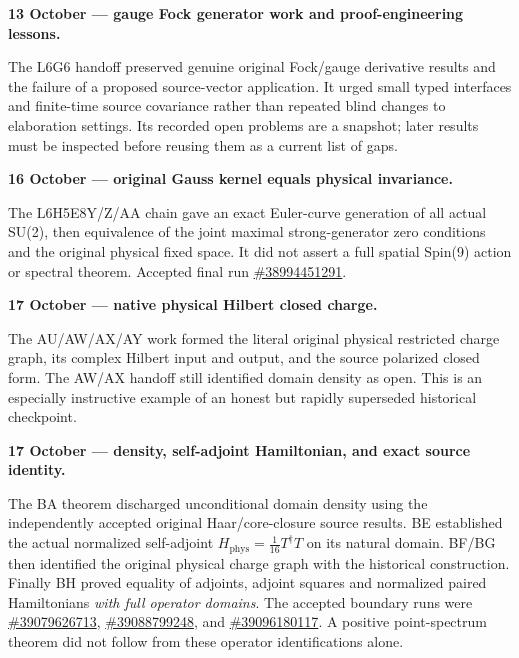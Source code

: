 \par\medskip\noindent\textbf{13 October --- gauge Fock generator work and proof-engineering lessons.}\par\smallskip
The L6G6 handoff preserved genuine original Fock/gauge derivative results
and the failure of a proposed source-vector application. It urged small
typed interfaces and finite-time source covariance rather than repeated
blind changes to elaboration settings. Its recorded open problems are a
snapshot; later results must be inspected before reusing them as a
current list of gaps.

\par\medskip\noindent\textbf{16 October --- original Gauss kernel equals physical invariance.}\par\smallskip
The L6H5E8Y/Z/AA chain gave an exact Euler-curve generation of all actual
SU(2), then equivalence of the joint maximal strong-generator zero
conditions and the original physical fixed space. It did not assert a
full spatial Spin(9) action or spectral theorem. Accepted final run
\href{https://github.com/etblink/Foundational-Convergence-Program/actions/runs/38994451291}{\#38994451291}.

\par\medskip\noindent\textbf{17 October --- native physical Hilbert closed charge.}\par\smallskip
The AU/AW/AX/AY work formed the literal original physical restricted
charge graph, its complex Hilbert input and output, and the source
polarized closed form. The AW/AX handoff still identified domain density
as open. This is an especially instructive example of an honest but
rapidly superseded historical checkpoint.

\par\medskip\noindent\textbf{17 October --- density, self-adjoint Hamiltonian, and exact source identity.}\par\smallskip
The BA theorem discharged unconditional domain density using the
independently accepted original Haar/core-closure source results.
BE established the actual normalized self-adjoint
$H_{\mathrm{phys}}=\frac1{16}T^\dagger T$ on its natural domain.
BF/BG then identified the original physical charge graph with the
historical construction. Finally BH proved equality of adjoints,
adjoint squares and normalized paired Hamiltonians \emph{with full
operator domains}. The accepted boundary runs were
\href{https://github.com/etblink/Foundational-Convergence-Program/actions/runs/39079626713}{\#39079626713},
\href{https://github.com/etblink/Foundational-Convergence-Program/actions/runs/39088799248}{\#39088799248}, and
\href{https://github.com/etblink/Foundational-Convergence-Program/actions/runs/39096180117}{\#39096180117}.
A positive point-spectrum theorem did not follow from these operator
identifications alone.


